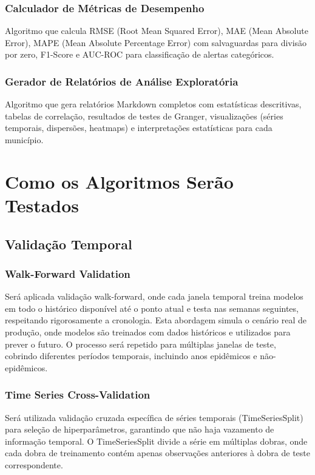 \subsubsection{Calculador de Métricas de Desempenho}

Algoritmo que calcula RMSE (Root Mean Squared Error), MAE (Mean Absolute Error), MAPE (Mean Absolute Percentage Error) com salvaguardas para divisão por zero, F1-Score e AUC-ROC para classificação de alertas categóricos.

\subsubsection{Gerador de Relatórios de Análise Exploratória}

Algoritmo que gera relatórios Markdown completos com estatísticas descritivas, tabelas de correlação, resultados de testes de Granger, visualizações (séries temporais, dispersões, heatmaps) e interpretações estatísticas para cada município.

\section{Como os Algoritmos Serão Testados}

\subsection{Validação Temporal}

\subsubsection{Walk-Forward Validation}

Será aplicada validação walk-forward, onde cada janela temporal treina modelos em todo o histórico disponível até o ponto atual e testa nas semanas seguintes, respeitando rigorosamente a cronologia. Esta abordagem simula o cenário real de produção, onde modelos são treinados com dados históricos e utilizados para prever o futuro. O processo será repetido para múltiplas janelas de teste, cobrindo diferentes períodos temporais, incluindo anos epidêmicos e não-epidêmicos.

\subsubsection{Time Series Cross-Validation}

Será utilizada validação cruzada específica de séries temporais (TimeSeriesSplit) para seleção de hiperparâmetros, garantindo que não haja vazamento de informação temporal. O TimeSeriesSplit divide a série em múltiplas dobras, onde cada dobra de treinamento contém apenas observações anteriores à dobra de teste correspondente.

